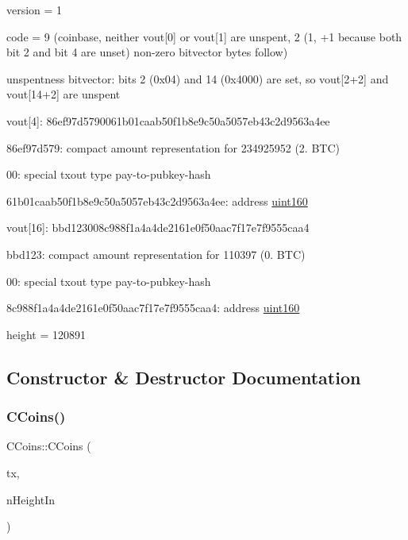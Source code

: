 \begin{DoxyItemize}
\item version = 1
\item code = 9 (coinbase, neither vout\mbox{[}0\mbox{]} or vout\mbox{[}1\mbox{]} are unspent, 2 (1, +1 because both bit 2 and bit 4 are unset) non-\/zero bitvector bytes follow)
\item unspentness bitvector\+: bits 2 (0x04) and 14 (0x4000) are set, so vout\mbox{[}2+2\mbox{]} and vout\mbox{[}14+2\mbox{]} are unspent
\item vout\mbox{[}4\mbox{]}\+: 86ef97d5790061b01caab50f1b8e9c50a5057eb43c2d9563a4ee
\begin{DoxyItemize}
\item 86ef97d579\+: compact amount representation for 234925952 (2. B\+TC)
\item 00\+: special txout type pay-\/to-\/pubkey-\/hash
\item 61b01caab50f1b8e9c50a5057eb43c2d9563a4ee\+: address \mbox{\hyperlink{classuint160}{uint160}}
\end{DoxyItemize}
\item vout\mbox{[}16\mbox{]}\+: bbd123008c988f1a4a4de2161e0f50aac7f17e7f9555caa4
\begin{DoxyItemize}
\item bbd123\+: compact amount representation for 110397 (0. B\+TC)
\item 00\+: special txout type pay-\/to-\/pubkey-\/hash
\item 8c988f1a4a4de2161e0f50aac7f17e7f9555caa4\+: address \mbox{\hyperlink{classuint160}{uint160}}
\end{DoxyItemize}
\item height = 120891 
\end{DoxyItemize}

\subsection{Constructor \& Destructor Documentation}
\mbox{\label{class_c_coins_a303f3b245c339c11a1ea4318b01ec290}} 
\subsubsection{\texorpdfstring{C\+Coins()}{CCoins()}\hspace{0.1cm}{\footnotesize\ttfamily [1/2]}}
{\footnotesize\ttfamily C\+Coins\+::\+C\+Coins (\begin{DoxyParamCaption}\item[{const C\+Transaction \&}]{tx,  }\item[{int}]{n\+Height\+In }\end{DoxyParamCaption})\hspace{0.3cm}{\ttfamily [inline]}}




